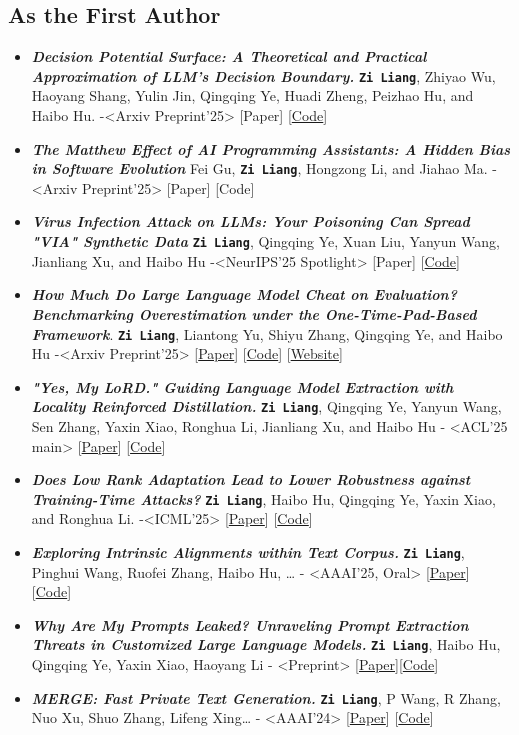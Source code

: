 \documentclass[11pt]{article}
\begin{document}
\subsection{As the First Author}
\label{sec:orgd640920}
\begin{itemize}
\item \textbf{\emph{Decision Potential Surface: A Theoretical and Practical Approximation of LLM's Decision Boundary.}} \textbf{\texttt{Zi Liang}}, Zhiyao Wu, Haoyang Shang, Yulin Jin, Qingqing Ye, Huadi Zheng, Peizhao Hu, and Haibo Hu. -<Arxiv Preprint'25> [Paper] [\href{https://github.com/liangzid/DPS}{Code}]
\item \emph{\textbf{The Matthew Effect of AI Programming Assistants: A Hidden Bias in Software Evolution}} Fei Gu, \textbf{\texttt{Zi Liang}}, Hongzong Li, and Jiahao Ma. -<Arxiv Preprint'25> [Paper] [Code]
\item \emph{\textbf{Virus Infection Attack on LLMs: Your Poisoning Can Spread "VIA" Synthetic Data}} \textbf{\texttt{Zi Liang}}, Qingqing Ye, Xuan Liu, Yanyun Wang, Jianliang Xu, and Haibo Hu -<NeurIPS'25 Spotlight> [Paper] [\href{https://github.com/liangzid/VirusInfectionAttack}{Code}]
\item \emph{\textbf{How Much Do Large Language Model Cheat on Evaluation? Benchmarking Overestimation under the One-Time-Pad-Based Framework}}. \textbf{\texttt{Zi Liang}}, Liantong Yu, Shiyu Zhang, Qingqing Ye, and Haibo Hu -<Arxiv Preprint'25> [\href{https://arxiv.org/abs/2507.19219}{Paper}] [\href{https://github.com/liangzid/ArxivRoll/}{Code}] [\href{https://arxivroll.moreoverai.com/}{Website}]
\item \emph{\textbf{"Yes, My LoRD." Guiding Language Model Extraction with Locality Reinforced Distillation.}} \textbf{\texttt{Zi Liang}}, Qingqing Ye, Yanyun Wang, Sen Zhang, Yaxin Xiao, Ronghua Li, Jianliang Xu, and Haibo Hu - <ACL'25 main> [\href{https://arxiv.org/abs/2409.02718}{Paper}] [\href{https://github.com/liangzid/LoRD-MEA}{Code}]
\item \emph{\textbf{Does Low Rank Adaptation Lead to Lower Robustness against Training-Time Attacks?}} \textbf{\texttt{Zi Liang}}, Haibo Hu, Qingqing Ye, Yaxin Xiao, and Ronghua Li. -<ICML'25> [\href{https://arxiv.org/abs/2505.12871}{Paper}] [\href{https://github.com/liangzid/LoRA-sSecurity}{Code}]
\item \emph{\textbf{Exploring Intrinsic Alignments within Text Corpus.}} \textbf{\texttt{Zi Liang}}, Pinghui Wang, Ruofei Zhang, Haibo Hu, \ldots{} - <AAAI'25, Oral> [\href{https://ojs.aaai.org/index.php/AAAI/article/view/34957}{Paper}] [\href{https://github.com/liangzid/TEMP}{Code}]
\item \emph{\textbf{Why Are My Prompts Leaked? Unraveling Prompt Extraction Threats in Customized Large Language Models.}} \textbf{\texttt{Zi Liang}}, Haibo Hu, Qingqing Ye, Yaxin Xiao, Haoyang Li - <Preprint> [\href{https://arxiv.org/abs/2408.02416}{Paper}][\href{https://github.com/liangzid/PromptExtractionEval}{Code}]
\item \emph{\textbf{MERGE: Fast Private Text Generation.}}  \textbf{\texttt{Zi Liang}}, P Wang, R Zhang, Nuo Xu, Shuo Zhang, Lifeng Xing… - <AAAI'24> [\href{https://arxiv.org/abs/2305.15769}{Paper}] [\href{https://github.com/liangzid/MERGE}{Code}]
\end{itemize}
\end{document}
